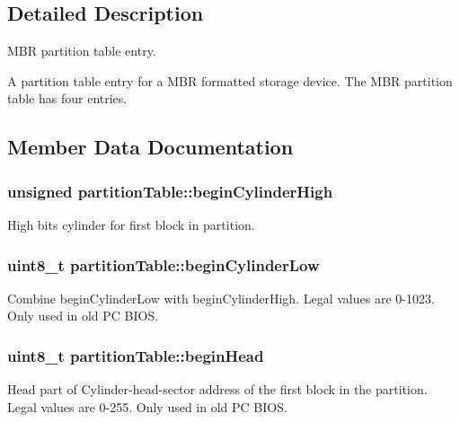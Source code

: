 \subsection{Detailed Description}
M\+B\+R partition table entry. 

A partition table entry for a M\+B\+R formatted storage device. The M\+B\+R partition table has four entries. 

\subsection{Member Data Documentation}
\hypertarget{structpartition_table_a744f0c7f9ad4c426b10de085b4f52392}{}
\subsubsection[{begin\+Cylinder\+High}]{\setlength{\rightskip}{0pt plus 5cm}unsigned partition\+Table\+::begin\+Cylinder\+High}\label{structpartition_table_a744f0c7f9ad4c426b10de085b4f52392}
High bits cylinder for first block in partition. \hypertarget{structpartition_table_a941fcb4df298f5f73ccca011bf40787a}{}
\subsubsection[{begin\+Cylinder\+Low}]{\setlength{\rightskip}{0pt plus 5cm}uint8\+\_\+t partition\+Table\+::begin\+Cylinder\+Low}\label{structpartition_table_a941fcb4df298f5f73ccca011bf40787a}
Combine begin\+Cylinder\+Low with begin\+Cylinder\+High. Legal values are 0-\/1023. Only used in old P\+C B\+I\+O\+S. \hypertarget{structpartition_table_a7d426694b8cf2151ae38568670a8c845}{}
\subsubsection[{begin\+Head}]{\setlength{\rightskip}{0pt plus 5cm}uint8\+\_\+t partition\+Table\+::begin\+Head}\label{structpartition_table_a7d426694b8cf2151ae38568670a8c845}
Head part of Cylinder-\/head-\/sector address of the first block in the partition. Legal values are 0-\/255. Only used in old P\+C B\+I\+O\+S. \hypertarget{structpartition_table_ae201c11d9671c9efc307c654a2b6c026}{}
